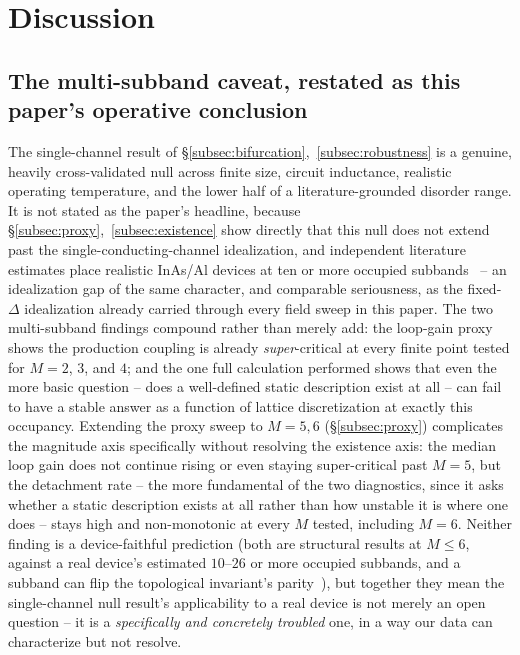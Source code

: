 \documentclass[aps,physrev,reprint,superscriptaddress,amsmath,amssymb,floatfix]{revtex4-2}
\begin{document}
\FloatBarrier
\section{Discussion}
\label{sec:discussion}

\subsection{The multi-subband caveat, restated as this paper's operative conclusion}

The single-channel result of \S\ref{subsec:bifurcation},~\ref{subsec:robustness} is a genuine, heavily
cross-validated null across finite size, circuit inductance, realistic
operating temperature, and the lower half of a literature-grounded
disorder range. It is not stated as the paper's headline, because
\S\ref{subsec:proxy},~\ref{subsec:existence} show directly that this null does
not extend past the single-conducting-channel idealization, and
independent literature estimates place realistic InAs/Al devices at ten
or more occupied subbands~\cite{woods2020,chang2015} -- an idealization
gap of the same character, and comparable seriousness, as the fixed-$\Delta$
idealization already carried through every field sweep in this paper.
The two multi-subband findings compound rather than merely add: the
loop-gain proxy shows the production coupling is already
\emph{super}-critical at every finite point tested for $M=2$, $3$, and
$4$; and the one full calculation performed shows that even the more
basic question -- does a well-defined static description exist at all --
can fail to have a stable answer as a function of lattice discretization
at exactly this occupancy. Extending the proxy sweep to $M=5,6$
(\S\ref{subsec:proxy}) complicates the magnitude axis specifically without
resolving the existence axis: the median loop gain does not continue
rising or even staying super-critical past $M=5$, but the detachment
rate -- the more fundamental of the two diagnostics, since it asks
whether a static description exists at all rather than how unstable it
is where one does -- stays high and non-monotonic at every $M$ tested,
including $M=6$. Neither finding is a device-faithful prediction (both
are structural results at $M\leq6$, against a real device's estimated
$10$--$26$ or more occupied subbands, and a subband can flip the
topological invariant's parity~\cite{lim2012}), but together they mean the
single-channel null result's applicability to a real device is not merely
an open question -- it is a \emph{specifically and concretely troubled}
one, in a way our data can characterize but not resolve.
\end{document}
